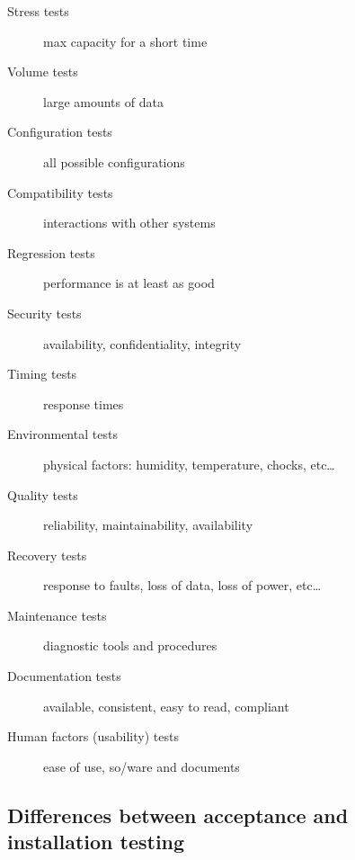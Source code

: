 \begin{description}
    \item[Stress tests] max capacity for a short time
    \item[Volume tests] large amounts of data
    \item[Configuration tests] all possible configurations
    \item[Compatibility tests] interactions with other systems
    \item[Regression tests] performance is at least as good
    \item[Security tests] availability, confidentiality, integrity
    \item[Timing tests] response times
    \item[Environmental tests] physical factors: humidity, temperature, chocks, etc\ldots
    \item[Quality tests] reliability, maintainability, availability
    \item[Recovery tests] response to faults, loss of data, loss of power, etc\ldots
    \item[Maintenance tests] diagnostic tools and procedures
    \item[Documentation tests] available, consistent, easy to read, compliant
    \item[Human factors (usability) tests] ease of use, so/ware and documents
\end{description}

\subsection{Differences between acceptance and installation testing}


